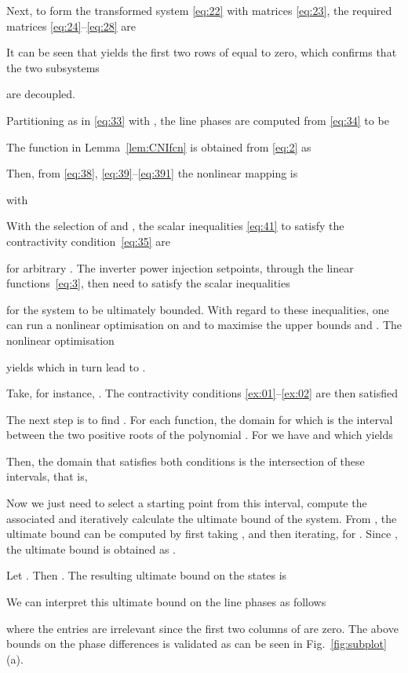\documentclass[letter, 10pt, conference]{ieeeconf}
\newcommand{\1}{\mathbf{1}}
\newcommand{\0}{\mathbf{0}}
\begin{document}
{Next, to form the transformed system \eqref{eq:22} with matrices
\eqref{eq:23}, the required matrices \eqref{eq:24}--\eqref{eq:28} are

It can be seen that  yields the first two rows of
 equal to zero, which confirms that the two subsystems

are decoupled.


Partitioning  as in \eqref{eq:33} with , 
the line phases are computed from \eqref{eq:34} to be

The function  in Lemma~\ref{lem:CNIfcn} is obtained from
\eqref{eq:2} as

Then, from \eqref{eq:38}, \eqref{eq:39}--\eqref{eq:391} the nonlinear
mapping  is

with
	

With the selection of  and , the
scalar inequalities \eqref{eq:41} to satisfy the contractivity
condition~\eqref{eq:35} are

for arbitrary .
The inverter power injection setpoints, through the linear
functions~\eqref{eq:3}, then need to satisfy the scalar inequalities

for the system to be ultimately bounded.  With regard to these
inequalities, one can run a nonlinear optimisation on  and 
to maximise the upper bounds  and .  The nonlinear
optimisation

yields  which in turn lead to
.

Take, for instance, . The contractivity conditions
\eqref{ex:01}--\eqref{ex:02} are then satisfied


The next step is to find . For each 
function, the  domain for which  is the
interval between the two positive roots of the polynomial .  For  we have
 and
 which yields

Then, the  domain that satisfies both conditions is the
intersection of these intervals, that is,

Now we just need to select a starting point  from this
interval, compute the associated  and iteratively calculate
the ultimate bound of the system.  From \cite{HaS13}, the ultimate
bound can be computed by first taking ,
 and then iterating,
 for . Since
, the ultimate bound is obtained as
.

Let .  Then
.  The resulting ultimate
bound on the  states is

We can interpret this ultimate bound 
on the line phases  
as follows

where the  entries are irrelevant since the first two columns
of  are zero.
The above bounds on the phase differences is validated as can be seen in
Fig.~\ref{fig:subplot}(a).

}
\end{document}
